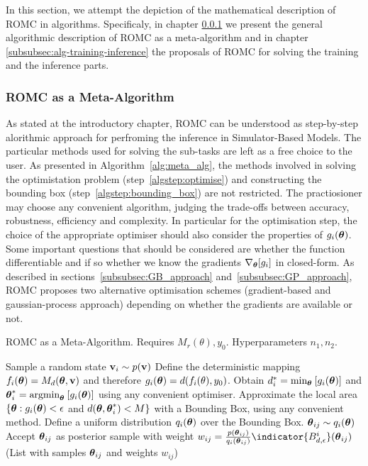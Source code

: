 In this section, we attempt the depiction of the mathematical
description of ROMC in algorithms. Specificaly, in chapter
\ref{subsubsec:romc-meta-algorithm} we present the general algorithmic
description of ROMC as a meta-algorithm and in chapter
\ref{subsubsec:alg-training-inference} the proposals of ROMC for
solving the training and the inference parts.

\subsubsection{ROMC as a Meta-Algorithm}
\label{subsubsec:romc-meta-algorithm}

As stated at the introductory chapter, ROMC can be understood as
step-by-step alorithmic approach for perfroming the inference in
Simulator-Based Models. The particular methods used for solving the
sub-tasks are left as a free choice to the user. As presented in
Algorithm~\ref{alg:meta_alg}, the methods involved in solving the
optimistation problem (step~\ref{algstep:optimise}) and constructing
the bounding box (step~\ref{algstep:bounding_box}) are not
restricted. The practiosioner may choose any convenient algorithm,
judging the trade-offs between accuracy, robustness, efficiency and
complexity. In particular for the optimisation step, the choice of the
appropriate optimiser should also consider the properties of
$g_i(\boldsymbol{\theta})$. Some important questions that should be considered are
whether the function differentiable and if so whether we know the
gradients $\nabla_{\boldsymbol{\theta}} [g_i] $ in closed-form. As described in
sections~\ref{subsubsec:GB_approach} and~\ref{subsubsec:GP_approach},
ROMC proposes two alternative optimisation schemes (gradient-based and
gaussian-process approach) depending on whether the gradients are
available or not.

\begin{algorithm}[t]
	\caption{ROMC as a Meta-Algorithm. Requires $M_r(\theta), y_0$. Hyperparameters $n_1,n_2$.}\label{alg:meta_alg}
	\begin{algorithmic}[1]
    \State Sample a random state $\mathbf{v}_i \sim p(\mathbf{v})$
		\State Define the deterministic mapping $f_i(\boldsymbol{\theta}) = M_d(\boldsymbol{\theta}, \mathbf{v})$ and therefore $g_i(\boldsymbol{\theta}) = d(f_i(\theta), y_0)$.
    \State Obtain $d_i^* = \text{min}_{\boldsymbol{\theta}} \: [g_i(\boldsymbol{\theta})]$ and $\boldsymbol{\theta}_i^* = \text{argmin}_{\boldsymbol{\theta}}\: [g_i(\boldsymbol{\theta})]$ using any convenient optimiser. \label{algstep:optimise}
    \State Approximate the local area $\{ \boldsymbol{\theta} : g_i(\boldsymbol{\theta}) < \epsilon$ and $d(\boldsymbol{\theta}, \boldsymbol{\theta}_i^*) < M \}$ with a Bounding Box, using any convenient method. \label{algstep:bounding_box}
		\State Define a uniform distribution $q_i(\boldsymbol{\theta})$ over the Bounding Box.
			\State $\boldsymbol{\theta}_{ij} \sim q_i(\boldsymbol{\theta})$
			\State Accept $\boldsymbol{\theta}_{ij}$ as posterior sample with weight $w_{ij} = \frac{p(\thetabij)}{q_i(\thetabij)} \indicator{\regioni} (\thetabij)$
			\EndFor
      \EndFor
     \Return(List with samples $\boldsymbol{\theta}_{ij}$ and weights $w_{ij}$) 
	\end{algorithmic}
\end{algorithm}


